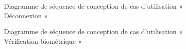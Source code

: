 \begin{figure}[H]
  \centering
  \caption{Diagramme de séquence de conception de cas d'utilisation « Déconnexion »}
  \label{fig:sequence_conception_logout_OIDC}
\end{figure}

\begin{figure}[H]
  \centering
  \caption{Diagramme de séquence de conception de cas d'utilisation « Vérification biométrique »}
  \label{fig:sequence_conception_verification_biometrique}
\end{figure}

